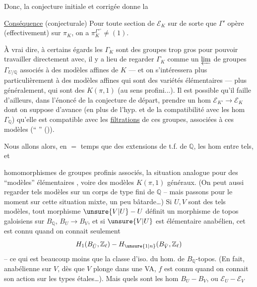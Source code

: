 Donc, la conjecture initiale  et corrigée donne la

\uline{Conséquence} (conjecturale) Pour toute  section de $\mathcal E_K$ sur   de sorte que $\Gamma'$ opère (effectivement) sur $\pi_K$, on a  $\pi_K^{\Gamma'^\circ}\ne(1)$.

À vrai dire, à certains égards les $\Gamma_K$ sont des groupes trop gros pour pouvoir travailler directement avec, il y a lieu de regarder $\Gamma_K$ comme un $\varprojlim$ de groupes $\Gamma_{U/\mathbb Q}$ associés à des modèles affines de $K$ --- et on s'intéressera plus particulièrement à des modèles affines qui sont des variétés élémentaires --- plus généralement, qui sont des $K(\pi,1)$ (au sens profini...). Il est possible qu'il faille d'ailleurs, dans l'énoncé de la conjecture de départ, prendre un hom  $\mathcal E_{K'}\longrightarrow\mathcal E_K$ dont on suppose d'avance (en plus de l'hyp.  et de la compatibilité avec les hom  $\Gamma_{\mathbb Q}$) qu'elle est compatible avec les \uline{filtrations} de ces groupes, associées à ces modèles (`` '' ()).

Nous allons alors, en $=$ temps que des extensions de t.f. de $\mathbb Q$, les hom entre tels, et

homomorphismes de groupes profinis associés,   la situation analogue pour des ``modèles'' élémentaires , voire des modèles $K(\pi,1)$ généraux. (On peut aussi regarder  tels modèles sur un corps   de type fini de $\mathbb Q$ -- mais passons pour le moment sur cette situation mixte, un peu bâtarde\ldots) Si $U,V$ sont des tels modèles, tout morphisme $\unsure{V|U}-U$ définit un morphisme de topos galoisiens sur $B_{\mathbb Q}$, $B_U\longrightarrow B_V$,  et si $\unsure{V|U}$ est  élémentaire anabélien, cet  est connu quand on connait seulement
\[
H_1(B_{\bar U},\mathbb Z_{\ell})-H_{\unsure{1|n}}(B_{\bar V},\mathbb Z_{\ell})
\]
-- ce qui est beaucoup moins que la classe d'iso. du hom. de $B_{\mathbb Q}$-topos. (En fait,   anabélienne sur $V$, dès que $V$  plonge dans une VA, $f$ est connu quand on connait son action sur les types étales\ldots). Mais quels sont les hom $B_U-B_V$, ou $\mathcal E_U-\mathcal E_V$

